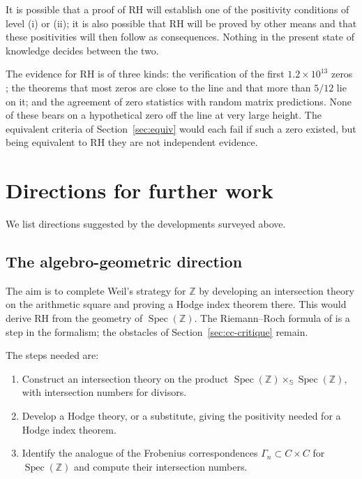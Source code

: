 \documentclass[11pt]{amsart}
\theoremstyle{definition}
\theoremstyle{remark}
\begin{document}
It is possible that a proof of RH will establish one of the positivity conditions of level (i) or (ii); it is also possible that RH will be proved by other means and that these positivities will then follow as consequences. Nothing in the present state of knowledge decides between the two.

The evidence for RH is of three kinds: the verification of the first $1.2\times10^{13}$ zeros \cite{platt2021}; the theorems that most zeros are close to the line and that more than $5/12$ lie on it; and the agreement of zero statistics with random matrix predictions. None of these bears on a hypothetical zero off the line at very large height. The equivalent criteria of Section~\ref{sec:equiv} would each fail if such a zero existed, but being equivalent to RH they are not independent evidence.

\section{Directions for further work}\label{sec:paths}

We list directions suggested by the developments surveyed above.

\subsection{The algebro-geometric direction}\label{sec:path-geom}

The aim is to complete Weil's strategy for $\mathbb{Z}$ by developing an intersection theory on the arithmetic square and proving a Hodge index theorem there. This would derive RH from the geometry of $\operatorname{Spec}(\mathbb{Z})$. The Riemann--Roch formula of \cite{connes2024} is a step in the formalism; the obstacles of Section~\ref{sec:cc-critique} remain.

The steps needed are:
\begin{enumerate}[label=(\roman*)]
\item Construct an intersection theory on the product $\operatorname{Spec}(\mathbb{Z}) \times_{\mathbb{S}} \operatorname{Spec}(\mathbb{Z})$, with intersection numbers for divisors.
\item Develop a Hodge theory, or a substitute, giving the positivity needed for a Hodge index theorem.
\item Identify the analogue of the Frobenius correspondences $\Gamma_n \subset C \times C$ for $\operatorname{Spec}(\mathbb{Z})$ and compute their intersection numbers.
\end{enumerate}
\end{document}
